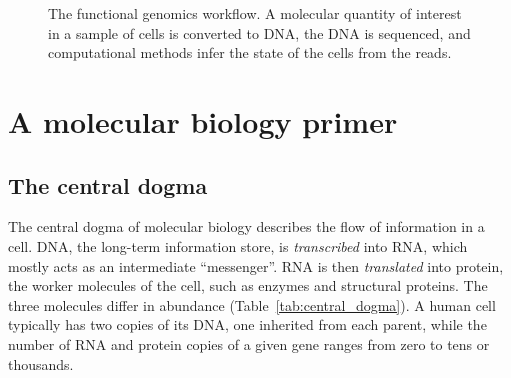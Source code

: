 \begin{figure}[t]
  \centering
  \caption{The functional genomics workflow. A molecular quantity of interest in a sample of cells is converted to DNA, the DNA is sequenced, and computational methods infer the state of the cells from the reads.}
  \label{fig:fg_loop}
\end{figure}

\section{A molecular biology primer}

\subsection{The central dogma}

The central dogma of molecular biology describes the flow of information in a cell. DNA, the long-term information store, is \emph{transcribed} into RNA, which mostly acts as an intermediate ``messenger''. RNA is then \emph{translated} into protein, the worker molecules of the cell, such as enzymes and structural proteins. The three molecules differ in abundance (Table~\ref{tab:central_dogma}). A human cell typically has two copies of its DNA, one inherited from each parent, while the number of RNA and protein copies of a given gene ranges from zero to tens or thousands.

